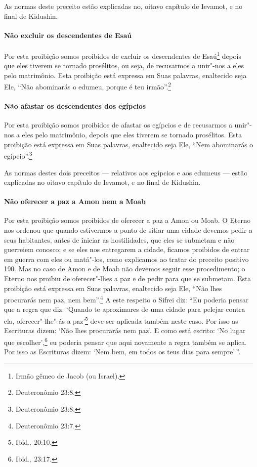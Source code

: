 \begin{multicols}{2}
As normas deste preceito estão explicadas no, oitavo capítulo de
Ievamot\starr, e no final de Kidushin\starr.


\paragraph{Não excluir os descendentes de Esaú}

Por esta proibição somos proibidos de excluir os descendentes de
Esaú\footnote{Irmão gêmeo de Jacob\starr{} (ou Israel).} depois que eles tiverem se tornado
prosélitos, ou seja, de recusarmos a unir"-nos a eles pelo matrimônio.
Esta proibição está expressa em Suas palavras, enaltecido seja Ele,
``Não abominarás o edumeu,\starr{} porque é teu irmão''.\footnote{Deuteronômio 23:8.}

\paragraph{Não afastar os descendentes dos egípcios}

Por esta proibição somos proibidos de afastar os egípcios e de
recusarmos a unir"-nos a eles pelo matrimônio, depois que eles tiverem se
tornado prosélitos. Esta proibição está expressa em Suas palavras,
enaltecido seja Ele, ``Nem abominarás o egípcio''.\footnote{Deuteronômio 23:8.}

As normas destes dois preceitos --- relativos aos egípcios e aos edumeus\starr{}
--- estão explicadas no oitavo capítulo de Ievamot\starr, e no final de
Kidushin\starr.

\paragraph{Não oferecer a paz a Amon\starr{} nem a Moab\starr}

Por esta proibição somos proibidos de oferecer a paz a Amon\starr{} ou Moab\starr. O
Eterno nos ordenou que quando estivermos a ponto de sitiar uma cidade
devemos pedir a seus habitantes, antes de iniciar as hostilidades, que
eles se submetam e não guerreiem conosco; e se eles nos entregarem a
cidade, ficamos proibidos de entrar em guerra com eles ou matá"-los,
como explicamos ao tratar do preceito positivo 190. Mas no caso de Amon\starr{}
e de Moab\starr{} não devemos seguir esse procedimento; o Eterno nos proibiu de
oferecer"-lhes a paz e de pedir para que se submetam. Esta proibição
está expressa em Suas palavras, enaltecido seja Ele, ``Não lhes
procurarás nem paz, nem bem''.\footnote{Deuteronômio 23:7.} A este respeito o
Sifrei\starr{} diz: ``Eu poderia pensar que a regra que diz: `Quando te
aproximares de uma cidade para pelejar contra ela, oferecer"-lhe"-ás a
paz'\footnote{Ibid., 20:10.} deve ser aplicada também neste caso. Por isso as
Escrituras dizem: `Não lhes procurarás nem paz'. E como está escrito:
`No lugar que escolher',\footnote{Ibid., 23:17.} eu poderia pensar que aqui
novamente a regra também se aplica. Por isso as Escrituras dizem: `Nem
bem, em todos os teus dias para sempre'\,''.


\end{multicols}
